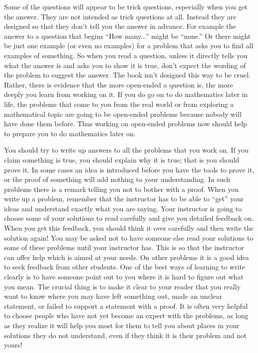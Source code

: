 \documentclass[10pt,]{book}
\theoremstyle{plain}
\theoremstyle{definition}
\theoremstyle{definition}
\numberwithin{equation}{chapter}
\begin{document}
\par
Some of the questions will appear to be trick questions, especially when you get the answer. They are not intended as trick questions at all. Instead they are designed so that they don't tell you the answer in advance. For example the answer to a question that begins ``How many...'' might be ``none.'' Or there might be just one example (or even no examples) for a problem that asks you to find all examples of something. So when you read a question, unless it directly tells you what the answer is and asks you to show it is true, don't expect the wording of the problem to suggest the answer. The book isn't designed this way to be cruel. Rather, there is evidence that the more open-ended a question is, the more deeply you learn from working on it. If you do go on to do mathematics later in life, the problems that come to you from the real world or from exploring a mathematical topic are going to be open-ended problems because nobody will have done them before. Thus working on open-ended problems now should help to prepare you to do mathematics later on.%
\par
You should try to write up answers to all the problems that you work on. If you claim something is true, you should explain why it is true; that is you should prove it. In some cases an idea is introduced before you have the tools to prove it, or the proof of something will add nothing to your understanding. In such problems there is a remark telling you not to bother with a proof. When you write up a problem, remember that the instructor has to be able to ``get'' your ideas and understand exactly what you are saying. Your instructor is going to choose some of your solutions to read carefully and give you detailed feedback on. When you get this feedback, you should think it over carefully and then write the solution again! You may be asked not to have someone else read your solutions to some of these problems until your instructor has. This is so that the instructor can offer help which is aimed at your needs. On other problems it is a good idea to seek feedback from other students. One of the best ways of learning to write clearly is to have someone point out to you where it is hard to figure out what you mean. The crucial thing is to make it clear to your reader that you really want to know where you may have left something out, made an unclear statement, or failed to support a statement with a proof. It is often very helpful to choose people who have not yet become an expert with the problems, as long as they realize it will help you most for them to tell you about places in your solutions they do not understand, even if they think it is their problem and not yours!%
\end{document}
